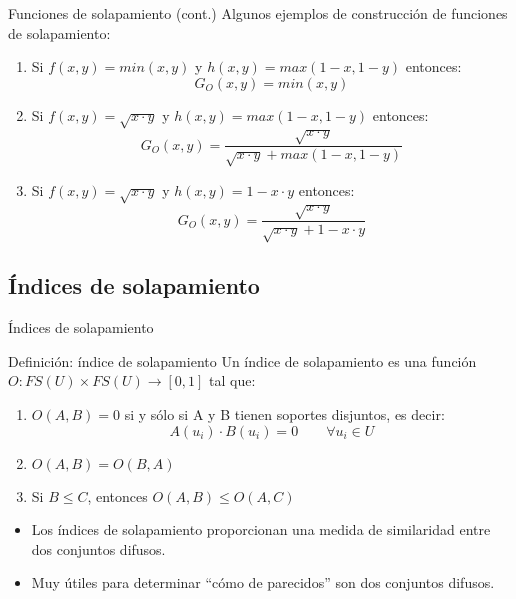 \documentclass{beamer}
\begin{document}
\begin{frame}{Funciones de solapamiento (cont.)}
	Algunos ejemplos de construcción de funciones de solapamiento: 
	\vspace{0.5cm}
	\begin{enumerate}
		\item Si $f(x,y)=min(x,y)$ y $h(x,y) = max(1-x,1-y)$ entonces: 
		\begin{equation}
		G_{O}(x,y) = min(x,y)
		\end{equation}
		\item Si $f(x,y)=\sqrt{x \cdot y}$ y $h(x,y) = max(1-x,1-y)$ entonces: 
		\begin{equation}G_{O}(x,y) = \frac{\sqrt{x \cdot y}}{\sqrt{x \cdot y} + max(1-x,1-y)}
		\end{equation}
		\item Si $f(x,y)=\sqrt{x \cdot y}$ y $h(x,y) = 1 - x \cdot y $ entonces: 
		\begin{equation}G_{O}(x,y) = \frac{\sqrt{x \cdot y}}{\sqrt{x \cdot y} + 1 - x \cdot y}
		\end{equation}
	\end{enumerate}
\end{frame}

\subsection{Índices de solapamiento}
\begin{frame}{Índices de solapamiento}
	\begin{block}{Definición: índice de solapamiento}
		Un índice de solapamiento es una función $O : FS(U) \times FS(U) \rightarrow [0,1]$ tal que:
		\begin{enumerate}
		\item $O(A,B) = 0$ si y sólo si A y B tienen soportes disjuntos, es decir: 
			\begin{equation}
				A(u_{i}) \cdot B(u_{i}) = 0 \qquad \forall u_{i} \in U
			\end{equation}
		\item $O(A,B) = O(B,A)$\label{BO2}
		\item Si $B \leq C$, entonces $O(A,B) \leq O(A,C)$\label{BO3}
		\end{enumerate}
	\end{block}
	\begin{itemize}
		\item Los índices de solapamiento proporcionan una medida de similaridad entre dos conjuntos difusos.
		\item Muy útiles para determinar ``cómo de parecidos'' son dos conjuntos difusos.
	\end{itemize}
\end{frame}
\end{document}
